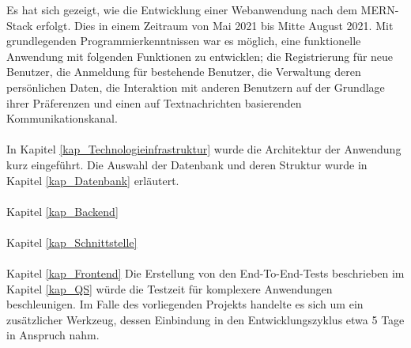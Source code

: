 Es hat sich gezeigt, wie die Entwicklung einer Webanwendung nach dem MERN-Stack erfolgt. Dies in einem Zeitraum von Mai 2021 bis Mitte August 2021. Mit grundlegenden Programmierkenntnissen war es möglich, eine funktionelle Anwendung mit folgenden Funktionen zu entwicklen; die Registrierung für neue Benutzer, die Anmeldung für bestehende Benutzer, die Verwaltung deren persönlichen Daten, die Interaktion mit anderen Benutzern auf der Grundlage ihrer Präferenzen und einen auf Textnachrichten basierenden Kommunikationskanal.
\\\\
In Kapitel \ref{kap_Technologieinfrastruktur} wurde die Architektur der Anwendung kurz eingeführt. %
Die Auswahl der Datenbank und deren Struktur wurde in Kapitel \ref{kap_Datenbank} erläutert.
\\\\
Kapitel \ref{kap_Backend} 
\\\\
Kapitel \ref{kap_Schnittstelle}\\\\
Kapitel \ref{kap_Frontend}
Die Erstellung von den End-To-End-Tests beschrieben im Kapitel \ref{kap_QS} würde die Testzeit für komplexere Anwendungen beschleunigen. Im Falle des vorliegenden Projekts handelte es sich um ein zusätzlicher Werkzeug, dessen Einbindung in den Entwicklungszyklus etwa 5 Tage in Anspruch nahm.
